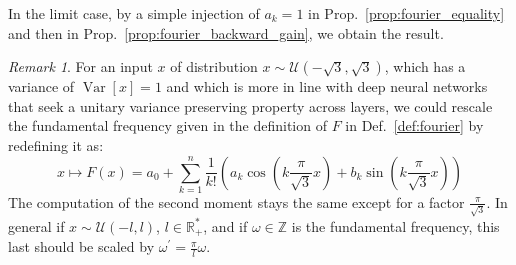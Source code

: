 \documentclass{article} %
\theoremstyle{plain}
\theoremstyle{definition}
\theoremstyle{remark}
\newtheorem{remark}[theorem]{Remark}
\begin{document}
In the limit case, by a simple injection of $a_k = 1$ in Prop.~\ref{prop:fourier_equality} and then in Prop.~\ref{prop:fourier_backward_gain}, we obtain the result.
\begin{remark}
     For an input $x$ of distribution $x \sim \mathcal{U}(-\sqrt{3},\sqrt{3})$, which has a variance of $\operatorname{Var}[x]=1$ and which is more in line with deep neural networks that seek a unitary variance preserving property across layers, we could rescale the fundamental frequency given in the  definition of $F$ in Def.~\ref{def:fourier} by redefining it as:
\begin{equation}
\label{eq:fourier_final}
    x \mapsto F(x) = a_0 + \sum_{k=1}^{n} \frac{1}{k!}\left(a_k \cos(k\frac{\pi}{\sqrt{3}} x) + b_k \sin(k\frac{\pi}{\sqrt{3}} x)\right)
\end{equation}
The computation of the second moment stays the same except for a factor $\frac{\pi}{\sqrt{3}}$. %
In general if $x \sim \mathcal{U}(-l,l)$, $l \in \mathbb{R_+^*}$, and if \( \omega \in \mathbb{Z} \) is the fundamental frequency, this last should be scaled by $\omega^\prime = \frac{\pi}{l}\omega$.
\end{remark}

\end{document}
